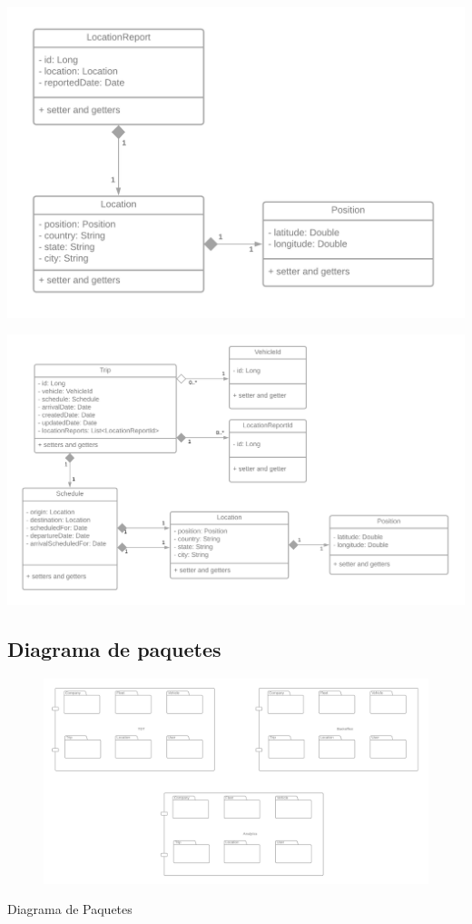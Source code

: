 \documentclass{article}
\begin{document}
\begin{center}
    \includegraphics[scale=.2]{pics/c4.png}%
\end{center}
\begin{center}
    \includegraphics[scale=.15]{pics/c5.png}%
\end{center}

\subsection{Diagrama de paquetes}
\begin{center}
\begin{figure}[h]
    \centering
    \includegraphics[scale=.1]{pics/paquetes.png}%
    \label{fig:paquetes}\end{figure}
    \large{Diagrama de Paquetes}
\end{center}
\end{document}
